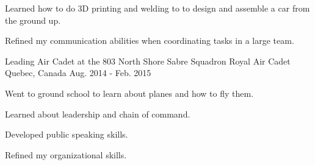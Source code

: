 \begin{cventries}
{\begin{cvitems}
        \item {Learned how to do 3D printing and welding to to design and assemble a car from the ground up.}
        \item {Refined my communication abilities when coordinating tasks in a large team.}
      \end{cvitems}
    }	 \newline
  \cventry
    {Leading Air Cadet at the 803 North Shore Sabre Squadron}
    {Royal Air Cadet}
    {Quebec, Canada}
    {Aug. 2014 - Feb. 2015}
    {
      \begin{cvitems}
        \item {Went to ground school to learn about planes and how to fly them.}
        \item {Learned about leadership and chain of command.}
        \item {Developed public speaking skills.}
        \item {Refined my organizational skills.}
      \end{cvitems}
    }	 \newline
    

\end{cventries}
